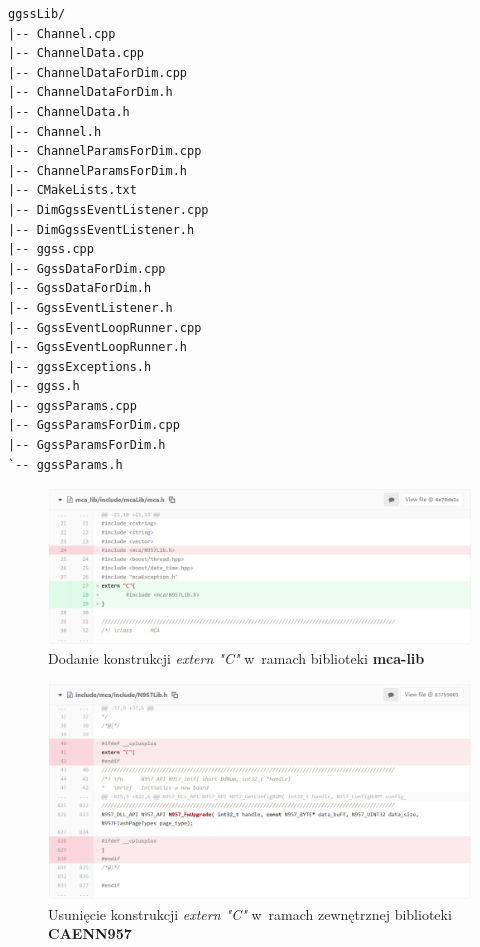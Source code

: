 \newpage

\begin{lstlisting}[caption={Pierwotna struktura biblioteki \textbf{ggss-lib}}, label={lst:oldLibStructure}]
ggssLib/
|-- Channel.cpp
|-- ChannelData.cpp
|-- ChannelDataForDim.cpp
|-- ChannelDataForDim.h
|-- ChannelData.h
|-- Channel.h
|-- ChannelParamsForDim.cpp
|-- ChannelParamsForDim.h
|-- CMakeLists.txt
|-- DimGgssEventListener.cpp
|-- DimGgssEventListener.h
|-- ggss.cpp
|-- GgssDataForDim.cpp
|-- GgssDataForDim.h
|-- GgssEventListener.h
|-- GgssEventLoopRunner.cpp
|-- GgssEventLoopRunner.h
|-- ggssExceptions.h
|-- ggss.h
|-- ggssParams.cpp
|-- GgssParamsForDim.cpp
|-- GgssParamsForDim.h
`-- ggssParams.h
\end{lstlisting}
\onecolumn
\newpage

\begin{figure}
\caption{Dodanie konstrukcji \textit{extern "{}C"} w~ramach biblioteki \textbf{mca-lib}}
\label{fig:addExternC}
\includegraphics[width=\textwidth]{res/png/addExternC}
\end{figure}

\begin{figure}
\caption{Usunięcie konstrukcji \textit{extern "{}C"} w~ramach zewnętrznej biblioteki \textbf{CAENN957}}
\label{fig:removeExternC}
\includegraphics[width=\textwidth]{res/png/removeExternC}
\end{figure}

